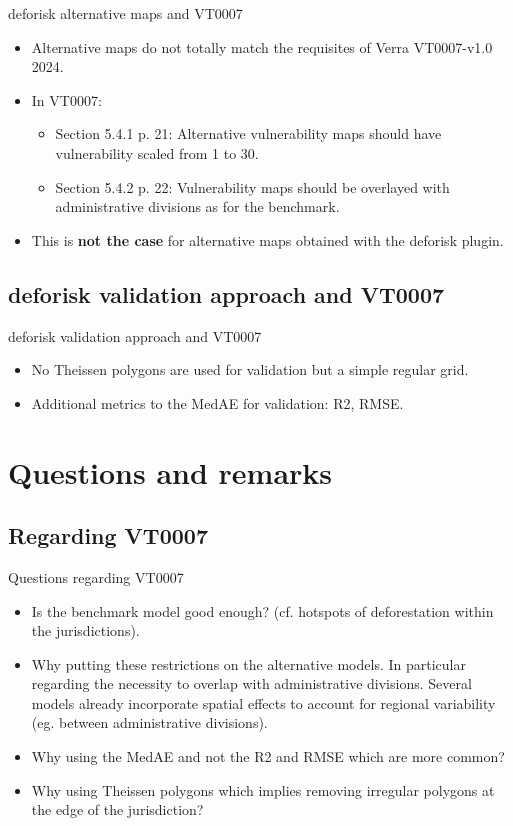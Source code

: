 \documentclass[10pt,table,dvipsnames,compress]{beamer}
\begin{document}
\begin{frame}[label={sec:orgb0d04e1}]{deforisk alternative maps and VT0007}
\begin{itemize}
\item Alternative maps do not totally match the requisites of Verra VT0007-v1.0 2024.
\item In VT0007:
\begin{itemize}
\item Section 5.4.1 p. 21: Alternative vulnerability maps should have vulnerability scaled from 1 to 30.
\item Section 5.4.2 p. 22: Vulnerability maps should be overlayed with administrative divisions as for the benchmark.
\end{itemize}
\item This is \textbf{not the case} for alternative maps obtained with the deforisk plugin.
\end{itemize}
\end{frame}

\subsection{deforisk validation approach and VT0007}
\label{sec:orge4c1e16}

\begin{frame}[label={sec:org3a52227}]{deforisk validation approach and VT0007}
\begin{itemize}
\item No Theissen polygons are used for validation but a simple regular grid.
\item Additional metrics to the MedAE for validation: R2, RMSE.
\end{itemize}
\end{frame}

\section{Questions and remarks}
\label{sec:orge4f2f71}

\subsection{Regarding VT0007}
\label{sec:org1c55904}

\begin{frame}[label={sec:orgf1451fc}]{Questions regarding VT0007}
\begin{itemize}
\item Is the benchmark model good enough? (cf. hotspots of deforestation within the jurisdictions).
\item Why putting these restrictions on the alternative models. In particular regarding the necessity to overlap with administrative divisions. Several models already incorporate spatial effects to account for regional variability (eg. between administrative divisions).
\item Why using the MedAE and not the R2 and RMSE which are more common?
\item Why using Theissen polygons which implies removing irregular polygons at the edge of the jurisdiction?
\end{itemize}
\end{frame}
\end{document}

